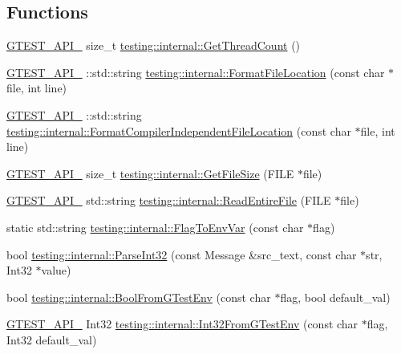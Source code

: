 \subsection*{Functions}
\begin{DoxyCompactItemize}
\item 
\mbox{\hyperlink{gtest-port_8h_aa73be6f0ba4a7456180a94904ce17790}{G\+T\+E\+S\+T\+\_\+\+A\+P\+I\+\_\+}} size\+\_\+t \mbox{\hyperlink{namespacetesting_1_1internal_a3b9b3649cd04558bf46c75de52a7ef34}{testing\+::internal\+::\+Get\+Thread\+Count}} ()
\item 
\mbox{\hyperlink{gtest-port_8h_aa73be6f0ba4a7456180a94904ce17790}{G\+T\+E\+S\+T\+\_\+\+A\+P\+I\+\_\+}} \+::std\+::string \mbox{\hyperlink{namespacetesting_1_1internal_a31b7c3abed4a7c395f42c61e993989f4}{testing\+::internal\+::\+Format\+File\+Location}} (const char $\ast$file, int line)
\item 
\mbox{\hyperlink{gtest-port_8h_aa73be6f0ba4a7456180a94904ce17790}{G\+T\+E\+S\+T\+\_\+\+A\+P\+I\+\_\+}} \+::std\+::string \mbox{\hyperlink{namespacetesting_1_1internal_a1ee4cde97868c53e442d3182496a9f3c}{testing\+::internal\+::\+Format\+Compiler\+Independent\+File\+Location}} (const char $\ast$file, int line)
\item 
\mbox{\hyperlink{gtest-port_8h_aa73be6f0ba4a7456180a94904ce17790}{G\+T\+E\+S\+T\+\_\+\+A\+P\+I\+\_\+}} size\+\_\+t \mbox{\hyperlink{namespacetesting_1_1internal_a06ca3f65f5e85c9ce7299b9e4cd52408}{testing\+::internal\+::\+Get\+File\+Size}} (F\+I\+LE $\ast$file)
\item 
\mbox{\hyperlink{gtest-port_8h_aa73be6f0ba4a7456180a94904ce17790}{G\+T\+E\+S\+T\+\_\+\+A\+P\+I\+\_\+}} std\+::string \mbox{\hyperlink{namespacetesting_1_1internal_a2cc0be60c54a8701423fe5297e1349ee}{testing\+::internal\+::\+Read\+Entire\+File}} (F\+I\+LE $\ast$file)
\item 
static std\+::string \mbox{\hyperlink{namespacetesting_1_1internal_a7540386ecf74d7ab7e2fa6089db94682}{testing\+::internal\+::\+Flag\+To\+Env\+Var}} (const char $\ast$flag)
\item 
bool \mbox{\hyperlink{namespacetesting_1_1internal_ac06fc81336a3d80755f4020d34321766}{testing\+::internal\+::\+Parse\+Int32}} (const Message \&src\+\_\+text, const char $\ast$str, Int32 $\ast$value)
\item 
bool \mbox{\hyperlink{namespacetesting_1_1internal_a67132cdce23fb71b6c38ee34ef81eb4c}{testing\+::internal\+::\+Bool\+From\+G\+Test\+Env}} (const char $\ast$flag, bool default\+\_\+val)
\item 
\mbox{\hyperlink{gtest-port_8h_aa73be6f0ba4a7456180a94904ce17790}{G\+T\+E\+S\+T\+\_\+\+A\+P\+I\+\_\+}} Int32 \mbox{\hyperlink{namespacetesting_1_1internal_a0f7e728793f9e6cb0aa2b69eaa468bf3}{testing\+::internal\+::\+Int32\+From\+G\+Test\+Env}} (const char $\ast$flag, Int32 default\+\_\+val)

\end{DoxyCompactItemize}
